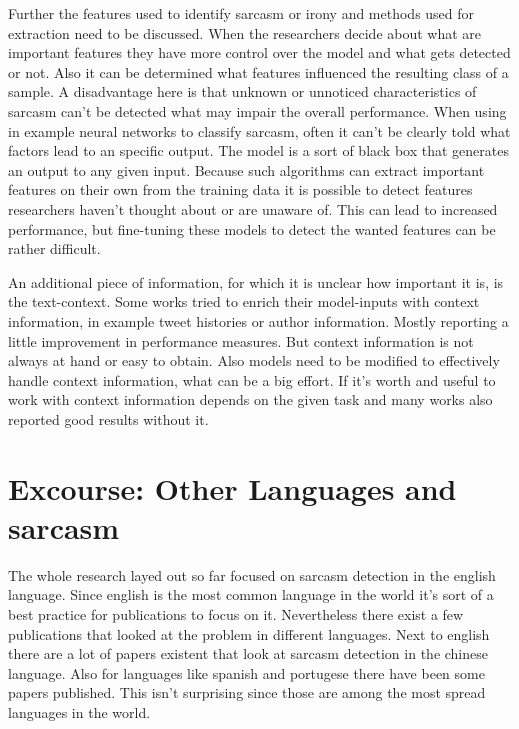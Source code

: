 \documentclass[sigconf,  review=false, nonacm=true]{acmart}
\begin{document}
Further the features used to identify sarcasm or irony and methods used for extraction need to be discussed. When the researchers decide about what are important features they have more control over the model and what gets detected or not. Also it can be determined what features influenced the resulting class of a sample. A disadvantage here is that unknown or unnoticed characteristics of sarcasm can't be detected what may impair the overall performance.
When using in example neural networks to classify sarcasm, often it can't be clearly told what factors lead to an specific output. The model is a sort of black box that generates an output to any given input. Because such algorithms can extract important features on their own from the training data it is possible to detect features researchers haven't thought about or are unaware of. This can lead to increased performance, but fine-tuning these models to detect the wanted features can be rather difficult.

An additional piece of information, for which it is unclear how important it is, is the text-context. Some works tried to enrich their model-inputs with context information, in example tweet histories or author information. Mostly reporting a little improvement in performance measures. But context information is not always at hand or easy to obtain. Also models need to be modified to effectively handle context information, what can be a big effort. If it's worth and useful to work with context information depends on the given task and many works also reported good results without it.


\section{Excourse: Other Languages and sarcasm}

The whole research layed out so far focused on sarcasm detection in the english language. Since english is the most common language in the world it's sort of a best practice for publications to focus on it. Nevertheless there exist a few publications that looked at the problem in different languages. Next to english there are a lot of papers existent that look at sarcasm detection in the chinese language. Also for languages like spanish and portugese there have been some papers published. This isn't surprising since those are among the most spread languages in the world.
\end{document}
